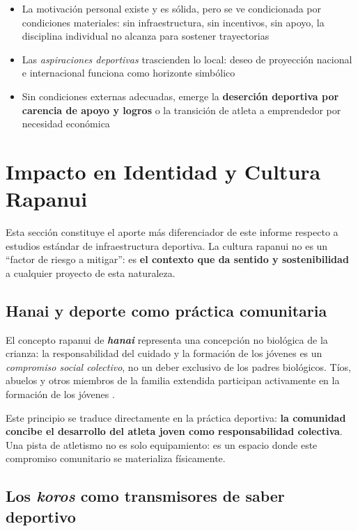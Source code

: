 \documentclass[12pt, a4paper]{article}
\begin{document}
\begin{itemize}[leftmargin=*, itemsep=3pt]
  \item La motivación personal existe y es sólida, pero se ve condicionada por
        condiciones materiales: sin infraestructura, sin incentivos, sin apoyo,
        la disciplina individual no alcanza para sostener trayectorias
  \item Las \textit{aspiraciones deportivas} trascienden lo local: deseo de
        proyección nacional e internacional funciona como horizonte simbólico
  \item Sin condiciones externas adecuadas, emerge la \textbf{deserción deportiva
        por carencia de apoyo y logros} o la transición de atleta a emprendedor
        por necesidad económica
\end{itemize}

\section{Impacto en Identidad y Cultura Rapanui}

Esta sección constituye el aporte más diferenciador de este informe respecto a
estudios estándar de infraestructura deportiva. La cultura rapanui no es un
``factor de riesgo a mitigar'': es \textbf{el contexto que da sentido y
sostenibilidad} a cualquier proyecto de esta naturaleza.

\subsection{Hanai y deporte como práctica comunitaria}

El concepto rapanui de \textbf{\textit{hanai}} representa una concepción no biológica
de la crianza: la responsabilidad del cuidado y la formación de los jóvenes es un
\textit{compromiso social colectivo}, no un deber exclusivo de los padres biológicos.
Tíos, abuelos y otros miembros de la familia extendida participan activamente en la
formación de los jóvenes \citep{pakomio2016}.

Este principio se traduce directamente en la práctica deportiva: \textbf{la comunidad
concibe el desarrollo del atleta joven como responsabilidad colectiva}. Una pista de
atletismo no es solo equipamiento: es un espacio donde este compromiso comunitario
se materializa físicamente.

\subsection{Los \textit{koros} como transmisores de saber deportivo}
\end{document}
